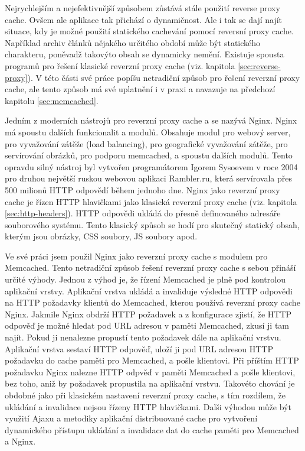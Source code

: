 \documentclass[12pt]{article}
\begin{document}
\clearpage

\obrazek
{}


\label{sec:reverse-proxy-cache}
Nejrychlejším a nejefektivnější způsobem zůstává stále použití reverse proxy cache. Ovšem ale aplikace tak přichází o dynamičnost. Ale i tak se dají najít situace, kdy je možné použití statického cachevání pomocí reversní proxy cache. Například archiv článků nějakého určitého období může být statického charakteru, poněvadž takovýto obsah se dynamicky nemění. Existuje spousta programů pro řešení klasické reverzní proxy cache (viz. kapitola \ref{sec:reverse-proxy}). V této části své práce popíšu netradiční způsob pro řešení reverzní proxy cache, ale tento způsob má své uplatnění i v praxi a navazuje na předchozí kapitolu \ref{sec:memcached}.

Jedním z moderních nástrojů pro reverzní proxy cache a se nazývá Nginx. Nginx má spoustu dalších funkcionalit a modulů. Obsahuje modul pro webový server, pro vyvažování zátěže (load balancing), pro geografické vyvažování zátěže, pro servírování obrázků, pro podporu memcached, a spoustu dalších modulů. Tento opravdu silný nástroj byl vytvořen programátorem Igorem Sysoevem v roce 2004 pro druhou největší ruskou webovou aplikaci Rambler.ru, která servírovala přes 500 milionů HTTP odpovědí během jednoho dne. Nginx jako reverzní proxy cache je řízen HTTP hlavičkami jako klasická reverzní proxy cache (viz. kapitola \ref{sec:http-headers}). HTTP odpovědi ukládá do přesně definovaného adresáře souborového systému. Tento klasický způsob se hodí pro skutečný statický obsah, kterým jsou obrázky, CSS soubory, JS soubory apod.\cite{nginx}

Ve své práci jsem použil Nginx jako reverzní proxy cache s modulem pro Memcached. Tento netradiční způsob řešení reverzní proxy cache s sebou přináší určité výhody. Jednou z výhod je, že řízení Memcached je plně pod kontrolou aplikační vrstvy. Aplikační vrstva ukládá a invaliduje výsledné HTTP odpovědi na HTTP požadavky klientů do Memcached, kterou používá reverzní proxy cache Nginx. Jakmile Nginx obdrží HTTP požadavek a z konfigurace zjistí, že HTTP odpověď je možné hledat pod URL adresou v paměti Memcached, zkusí ji tam najít. Pokud ji nenalezne propustí tento požadavek dále na aplikační vrstvu. Aplikační vrstva sestaví HTTP odpověď, uloží ji pod URL adresou HTTP požadavku do cache paměti pro Memcached, a pošle klientovi. Při příštím HTTP požadavku Nginx nalezne HTTP odpvěď v paměti Memcached a pošle klientovi, bez toho, aniž by požadavek propustila na aplikační vrstvu. Takovéto chování je obdobné jako při klasickém nastavení reverzní proxy cache, s tím rozdílem, že ukládání a invalidace nejsou řízeny HTTP hlavičkami. Dalši výhodou může být využití Ajaxu a metodiky aplikační distribuované cache pro vytvoření dynamického přístupu ukládání a invalidace dat do cache paměti pro Memcached a Nginx.\cite{nginx-memcached}
\end{document}
